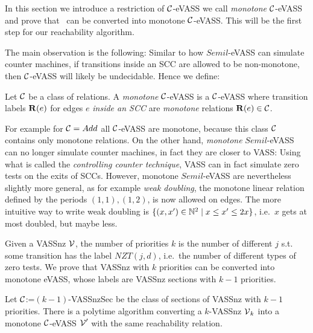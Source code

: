 
In this section we introduce a restriction of \(\mathcal{C}\)-eVASS we call \emph{monotone} \(\mathcal{C}\)-eVASS and prove that \ConsideredModel\ can be converted into monotone \(\mathcal{C}\)-eVASS. This will be the first step for our reachability algorithm.

The main observation is the following: Similar to how \(Semil\)-eVASS can simulate counter machines, if transitions inside an SCC are allowed to be non-monotone, then \(\mathcal{C}\)-eVASS will likely be undecidable. Hence we define:

\begin{definition} \label{DefinitionMonotoneEVASS}
Let \(\mathcal{C}\) be a class of relations. A \emph{monotone} \(\mathcal{C}\)-eVASS is a \(\mathcal{C}\)-eVASS where transition labels \(\mathbf{R}(e)\) for edges \(e\) \emph{inside an SCC} are \emph{monotone} relations \(\mathbf{R}(e) \in \mathcal{C}\).
\end{definition}

For example for \(\mathcal{C}=Add\) all \(\mathcal{C}\)-eVASS are monotone, because this class \(\mathcal{C}\) contains only monotone relations. On the other hand, \emph{monotone} \(Semil\)-eVASS can no longer simulate counter machines, in fact they are closer to VASS: Using what is called the \emph{controlling counter technique}, VASS can in fact simulate zero tests on the exits of SCCs. However, monotone \(Semil\)-eVASS are nevertheless slightly more general, as for example \emph{weak doubling}, the monotone linear relation defined by the periods \((1,1), (1,2)\), is now allowed on edges. The more intuitive way to write weak doubling is \(\{(x,x') \in \mathbb{N}^2 \mid x \leq x' \leq 2x\}\), i.e.\ \(x\) gets at most doubled, but maybe less.

Given a VASSnz \(\operatorname{\mathcal{V}}\), the number of priorities \(k\) is the number of different \(j\) s.t. some transition has the label \(NZT(j,d)\), i.e.\ the number of different types of zero tests. We prove that VASSnz with \(k\) priorities can be converted into monotone eVASS, whose labels are VASSnz sections with \(k-1\) priorities.

\begin{lemma} \label{LemmaConvertVASSnzToEVASS}
Let \(\mathcal{C}\):=\((k-1)\)-VASSnzSec be the class of sections of VASSnz with \(k-1\) priorities. There is a polytime algorithm converting a \(k\)-VASSnz \(\operatorname{\mathcal{V}}_k\) into a monotone \(\mathcal{C}\)-eVASS \(\operatorname{\mathcal{V}}'\) with the same reachability relation. 
\end{lemma}

